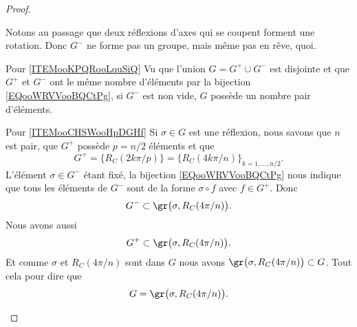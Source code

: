 \begin{proof}
\begin{subproof}
\begin{subproof}
			Notons au passage que deux réflexions d'axes qui se coupent forment une rotation. Donc \( G^-\) ne forme pas un groupe, mais même pas en rêve, quoi.
			\item[Pour \ref{ITEMooKPQRooLquSiQ}]
			Vu que l'union \( G=G^+\cup G^-\) est disjointe et que \( G^+\) et $G^-$ ont le même nombre d'éléments par la bijection \ref{EQooWRVVooBQCtPg}, si \( G^-\) est non vide, \( G\) possède un nombre pair d'éléments.
			\item[Pour \ref{ITEMooCHSWooHpDGHf}]
			Si \( \sigma\in G\) est une réflexion, nous savons que \( n\) est pair, que \( G^+\) possède \( p=n/2\) éléments et que
			\begin{equation}
				G^+=\{  R_C(2k\pi/p)  \}=\{  R_C(4k\pi/n) \}_{k=1,\ldots, n/2}.
			\end{equation}
			L'élément \( \sigma\in G^- \) étant fixé, la bijection \eqref{EQooWRVVooBQCtPg} nous indique que tous les éléments de \( G^-\) sont de la forme \( \sigma\circ f\) avec \( f\in G^+\). Donc
			\begin{equation}
				G^{-}\subset \gr\big( \sigma, R_C(4\pi/n)  \big).
			\end{equation}
			Nous avons aussi
			\begin{equation}
				G^+\subset \gr\big( \sigma,  R_C(4\pi/n)  \big).
			\end{equation}
			Et comme \( \sigma\) et \(  R_C(4\pi/n)  \) sont dans \( G\) nous avons \( \gr\big( \sigma ,  R_C(4\pi/n)  \big)\subset G\). Tout cela pour dire que
			\begin{equation}
				G=\gr\big( \sigma,  R_C(4\pi/n) \big).
			\end{equation}


\end{subproof}
\end{subproof}
\end{proof}
